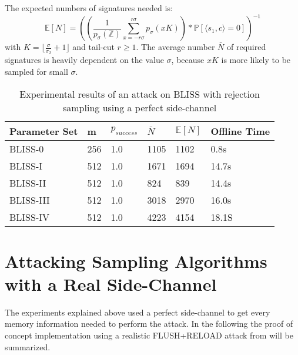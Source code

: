 The expected numbers of signatures needed is:
\begin{equation*}
	\mathbb{E}[N] = ((\frac{1}{p_\sigma(\mathbb{Z})}\sum_{x=-r\sigma}^{r\sigma}p_\sigma(xK))*\mathbb{P}[\langle s_1,c \rangle = 0])^{-1}	
\end{equation*}
with $K= \lfloor \frac{\sigma}{\sigma_2}+1\rfloor$ and tail-cut $r\ge 1$. The average number $\bar{N}$ of required signatures is heavily dependent on the value $\sigma$, because $xK$ is more likely to be sampled for small $\sigma$. 
\begin{table}[h!]
	\centering
	
\begin{tabular}{|l|l|l|l|l|l|} 	
	Parameter Set & m & $p_{success}$&$\bar{N}$&$\mathbb{E}[N]$&Offline Time\\\hline
	BLISS-0 & 256 & 1.0 &1105 & 1102 &0.8s\\
	BLISS-I&512&1.0&1671 & 1694 & 14.7s \\
	BLISS-II&512 & 1.0 & 824&839 & 14.4s\\
	BLISS-III&512 & 1.0 & 3018 & 2970 & 16.0s\\
	BLISS-IV&512 & 1.0 & 4223 & 4154 & 18.1S\\
\end{tabular}
\caption{Experimental results of an attack on BLISS with rejection sampling using a perfect side-channel}
\label{tab:rejectionperfect}
\end{table}
\newpage
\section{Attacking Sampling Algorithms with a Real Side-Channel}
The experiments explained above used a perfect side-channel to get every memory information needed to perform the attack. In the following the proof of concept implementation using a realistic FLUSH+RELOAD attack from \cite{cryptoeprint:2016:300} will be summarized.
